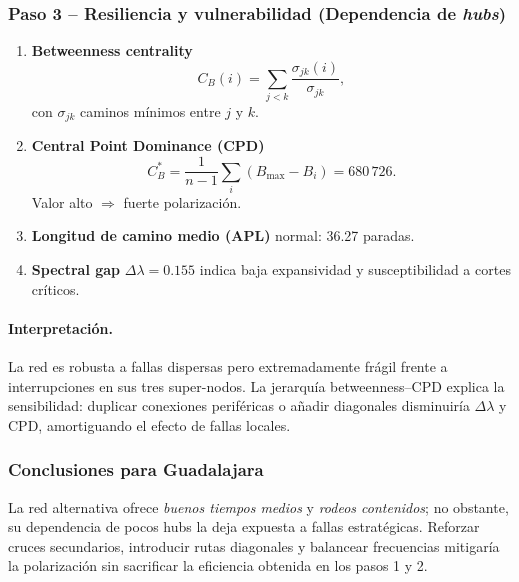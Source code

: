 \documentclass[openany]{book}
\begin{document}
		\subsubsection*{Paso 3 – Resiliencia y vulnerabilidad (Dependencia de \textit{hubs})}
		\begin{enumerate}[label=\alph*)]
		\item \textbf{Betweenness centrality}
			  \[
			  C_B(i)=\sum_{j<k}\frac{\sigma_{jk}(i)}{\sigma_{jk}},
			  \]
			  con $\sigma_{jk}$ caminos mínimos entre $j$ y $k$.

		\item \textbf{Central Point Dominance (CPD)}
			  \[
			  C_B^{\ast}=\frac{1}{n-1}\sum_{i}(B_{\max}-B_i)=680\,726.
			  \]
			  Valor alto $\Rightarrow$ fuerte polarización.

		\item \textbf{Longitud de camino medio (APL)} normal: 36.27 paradas.

		\item \textbf{Spectral gap} $\Delta\lambda=0.155$ indica baja expansividad y susceptibilidad a cortes críticos.
		\end{enumerate}

		\paragraph{Interpretación.}
		La red es robusta a fallas dispersas pero extremadamente frágil frente a interrupciones en sus tres super-nodos. La jerarquía betweenness–CPD explica la sensibilidad: duplicar conexiones periféricas o añadir diagonales disminuiría $\Delta\lambda$ y CPD, amortiguando el efecto de fallas locales.

		\subsubsection*{Conclusiones para Guadalajara}
		La red alternativa ofrece \textit{buenos tiempos medios} y \textit{rodeos contenidos}; no obstante, su dependencia de pocos hubs la deja expuesta a fallas estratégicas. Reforzar cruces secundarios, introducir rutas diagonales y balancear frecuencias mitigaría la polarización sin sacrificar la eficiencia obtenida en los pasos 1 y 2.
\end{document}
